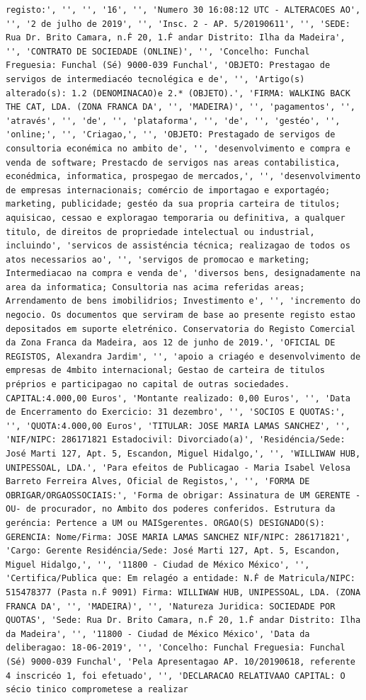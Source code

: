 \documentclass[
  12pt,
]{article}
\begin{document}
\begin{verbatim}
registo:', '', '', '16', '', 'Numero 30 16:08:12 UTC - ALTERACOES AO', '', '2 de julho de 2019', '', 'Insc. 2 - AP. 5/20190611', '', 'SEDE: Rua Dr. Brito Camara, n.Ḟ 20, 1.Ḟ andar Distrito: Ilha da Madeira', '', 'CONTRATO DE SOCIEDADE (ONLINE)', '', 'Concelho: Funchal Freguesia: Funchal (Sé) 9000-039 Funchal', 'OBJETO: Prestagao de servigos de intermediacéo tecnolégica e de', '', 'Artigo(s) alterado(s): 1.2 (DENOMINACAO)e 2.* (OBJETO).', 'FIRMA: WALKING BACK THE CAT, LDA. (ZONA FRANCA DA', '', 'MADEIRA)', '', 'pagamentos', '', 'através', '', 'de', '', 'plataforma', '', 'de', '', 'gestéo', '', 'online;', '', 'Criagao,', '', 'OBJETO: Prestagado de servigos de consultoria econémica no ambito de', '', 'desenvolvimento e compra e venda de software; Prestacdo de servigos nas areas contabilistica, econédmica, informatica, prospegao de mercados,', '', 'desenvolvimento de empresas internacionais; comércio de importagao e exportagéo; marketing, publicidade; gestéo da sua propria carteira de titulos; aquisicao, cessao e exploragao temporaria ou definitiva, a qualquer titulo, de direitos de propriedade intelectual ou industrial, incluindo', 'servicos de assisténcia técnica; realizagao de todos os atos necessarios ao', '', 'servigos de promocao e marketing; Intermediacao na compra e venda de', 'diversos bens, designadamente na area da informatica; Consultoria nas acima referidas areas; Arrendamento de bens imobilidrios; Investimento e', '', 'incremento do negocio. Os documentos que serviram de base ao presente registo estao depositados em suporte eletrénico. Conservatoria do Registo Comercial da Zona Franca da Madeira, aos 12 de junho de 2019.', 'OFICIAL DE REGISTOS, Alexandra Jardim', '', 'apoio a criagéo e desenvolvimento de empresas de 4mbito internacional; Gestao de carteira de titulos préprios e participagao no capital de outras sociedades. CAPITAL:4.000,00 Euros', 'Montante realizado: 0,00 Euros', '', 'Data de Encerramento do Exercicio: 31 dezembro', '', 'SOCIOS E QUOTAS:', '', 'QUOTA:4.000,00 Euros', 'TITULAR: JOSE MARIA LAMAS SANCHEZ', '', 'NIF/NIPC: 286171821 Estadocivil: Divorciado(a)', 'Residéncia/Sede: José Marti 127, Apt. 5, Escandon, Miguel Hidalgo,', '', 'WILLIWAW HUB, UNIPESSOAL, LDA.', 'Para efeitos de Publicagao - Maria Isabel Velosa Barreto Ferreira Alves, Oficial de Registos,', '', 'FORMA DE OBRIGAR/ORGAOSSOCIAIS:', 'Forma de obrigar: Assinatura de UM GERENTE -OU- de procurador, no Ambito dos poderes conferidos. Estrutura da geréncia: Pertence a UM ou MAISgerentes. ORGAO(S) DESIGNADO(S): GERENCIA: Nome/Firma: JOSE MARIA LAMAS SANCHEZ NIF/NIPC: 286171821', 'Cargo: Gerente Residéncia/Sede: José Marti 127, Apt. 5, Escandon, Miguel Hidalgo,', '', '11800 - Ciudad de México México', '', 'Certifica/Publica que: Em relagéo a entidade: N.Ḟ de Matricula/NIPC: 515478377 (Pasta n.Ḟ 9091) Firma: WILLIWAW HUB, UNIPESSOAL, LDA. (ZONA FRANCA DA', '', 'MADEIRA)', '', 'Natureza Juridica: SOCIEDADE POR QUOTAS', 'Sede: Rua Dr. Brito Camara, n.Ḟ 20, 1.Ḟ andar Distrito: Ilha da Madeira', '', '11800 - Ciudad de México México', 'Data da deliberagao: 18-06-2019', '', 'Concelho: Funchal Freguesia: Funchal (Sé) 9000-039 Funchal', 'Pela Apresentagao AP. 10/20190618, referente 4 inscricéo 1, foi efetuado', '', 'DECLARACAO RELATIVAAO CAPITAL: O sécio tinico comprometese a realizar 
\end{verbatim}
\end{document}
